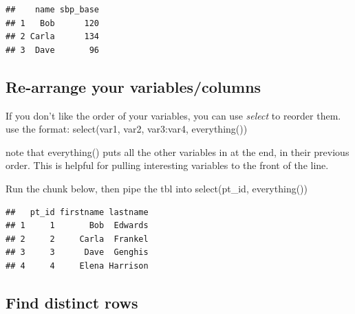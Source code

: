 \documentclass[
]{book}
\newenvironment{Shaded}{\begin{snugshade}}{\end{snugshade}}
\newcommand{\DecValTok}[1]{\textcolor[rgb]{0.00,0.00,0.81}{#1}}
\newcommand{\KeywordTok}[1]{\textcolor[rgb]{0.13,0.29,0.53}{\textbf{#1}}}
\newcommand{\NormalTok}[1]{#1}
\newcommand{\OperatorTok}[1]{\textcolor[rgb]{0.81,0.36,0.00}{\textbf{#1}}}
\newcommand{\StringTok}[1]{\textcolor[rgb]{0.31,0.60,0.02}{#1}}
\begin{document}
\begin{verbatim}
##    name sbp_base
## 1   Bob      120
## 2 Carla      134
## 3  Dave       96
\end{verbatim}

\hypertarget{re-arrange-your-variablescolumns}{%
\subsection{Re-arrange your variables/columns}\label{re-arrange-your-variablescolumns}}

If you don't like the order of your variables, you can use \emph{select} to reorder them.
use the format:
select(var1, var2, var3:var4, everything())

note that everything() puts all the other variables in at the end, in their previous order.
This is helpful for pulling interesting variables to the front of the line.

Run the chunk below,
then pipe the tbl into
select(pt\_id, everything())

\begin{Shaded}
\end{Shaded}

\begin{verbatim}
##   pt_id firstname lastname
## 1     1       Bob  Edwards
## 2     2     Carla  Frankel
## 3     3      Dave  Genghis
## 4     4     Elena Harrison
\end{verbatim}

\hypertarget{find-distinct-rows}{%
\subsection{Find distinct rows}\label{find-distinct-rows}}
\end{document}
